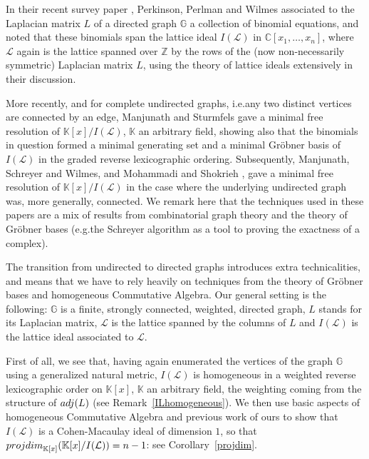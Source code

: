 \documentclass[10pt]{amsart}
\newcommand{\eg}{e.g.}
\newcommand{\ie}{i.e.}
\newcommand{\mbz}{\mbox{$\mathbb{Z}$}}
\newcommand{\mbc}{\mbox{$\mathbb{C}$}}
\newcommand{\mbk}{\mbox{$\mathbb{K}$}}
\newcommand{\mbg}{\mbox{$\mathbb{G}$}}
\newcommand{\mcl}{\mbox{$\mathcal{L}$}}
\newcommand{\pd}{\mbox{${\rm projdim}$}}
\newcommand{\adj}{\mbox{${\rm adj}$}}
\theoremstyle{definition}
\theoremstyle{remark}
\begin{document}
In their recent survey paper \cite{ppw}, Perkinson, Perlman and Wilmes
associated to the Laplacian matrix $L$ of a directed graph $\mbg$ a
collection of binomial equations, and noted that these binomials span
the lattice ideal $I(\mcl)$ in $\mbc[x_1,\ldots ,x_n]$, where $\mcl$
again is the lattice spanned over $\mbz$ by the rows of the (now
non-necessarily symmetric) Laplacian matrix $L$, using the theory of
lattice ideals extensively in their discussion.

More recently, and for complete undirected graphs, \ie any
two distinct vertices are connected by an edge, Manjunath and
Sturmfels \cite{ms} gave a minimal free resolution of
$\mbk[x]/I(\mcl)$, $\mbk$ an arbitrary field, showing also
that the binomials in question formed a minimal generating set and a
minimal Gr\"obner basis of $I(\mcl)$ in the graded reverse
lexicographic ordering. Subsequently, Manjunath, Schreyer and Wilmes\cite{msw}, and Mohammadi and Shokrieh \cite{mos}, gave a minimal free
resolution of $\mbk[x]/I(\mcl)$ in the case where the underlying
undirected graph was, more generally, connected. We remark here that
the techniques used in these papers are a mix of results from
combinatorial graph theory and the theory of Gr\"obner bases (\eg the
Schreyer algorithm as a tool to proving the exactness of a complex).

The transition from undirected to directed graphs introduces extra
technicalities, and means that we have to rely heavily on techniques
from the theory of Gr\"obner bases and homogeneous Commutative
Algebra. Our general setting is the following: $\mbg$ is a finite,
strongly connected, weighted, directed graph, $L$ stands for its
Laplacian matrix, $\mcl$ is the lattice spanned by the columns of $L$
and $I(\mcl)$ is the lattice ideal associated to $\mcl$.

First of all, we see that, having again enumerated the vertices of the
graph $\mbg$ using a generalized natural metric, $I(\mcl)$ is
homogeneous in a weighted reverse lexicographic order on $\mbk[x]$,
$\mbk$ an arbitrary field, the weighting coming from the structure of
$\adj(L)$ (see Remark~\ref{ILhomogeneous}). We then use basic aspects
of homogeneous Commutative Algebra and previous work of ours to show
that $I(\mcl)$ is a Cohen-Macaulay ideal of dimension $1$, so that
$\pd_{\mathbb{K}[x]}(\mbk[x]/I(\mcl))=n-1$: see
Corollary~\ref{projdim}.
\end{document}
